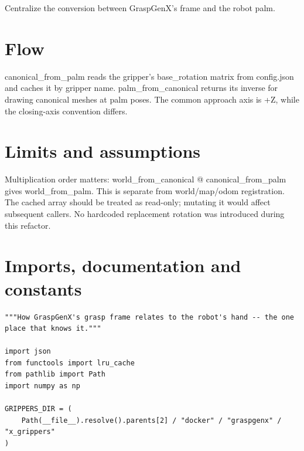 \documentclass[11pt,a4paper]{book}
\begin{document}
Centralize the conversion between GraspGenX's frame and the robot palm.

\section*{Flow}

canonical\_from\_palm reads the gripper's base\_rotation matrix from config.json and caches it by gripper name. palm\_from\_canonical returns its inverse for drawing canonical meshes at palm poses. The common approach axis is +Z, while the closing-axis convention differs.

\section*{Limits and assumptions}

Multiplication order matters: world\_from\_canonical @ canonical\_from\_palm gives world\_from\_palm. This is separate from world/map/odom registration. The cached array should be treated as read-only; mutating it would affect subsequent callers. No hardcoded replacement rotation was introduced during this refactor.

\section{Imports, documentation and constants}

\begin{lstlisting}[firstnumber=1]
"""How GraspGenX's grasp frame relates to the robot's hand -- the one place that knows it."""

import json
from functools import lru_cache
from pathlib import Path
import numpy as np

GRIPPERS_DIR = (
    Path(__file__).resolve().parents[2] / "docker" / "graspgenx" / "x_grippers"
)


\end{lstlisting}
\end{document}
